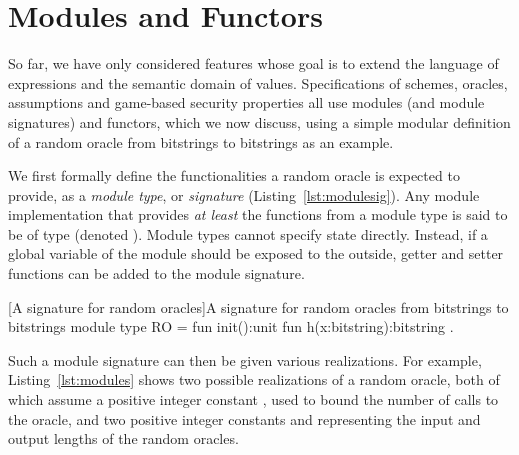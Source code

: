 \section{Modules and Functors\label{sec:modules}}

So far, we have only considered features whose goal is to extend the language of
expressions and the semantic domain of values. Specifications of schemes,
oracles, assumptions and game-based security properties all use modules (and
module signatures) and functors, which we now discuss, using a simple modular
definition of a random oracle from bitstrings to bitstrings as an example.

We first formally define the functionalities a random oracle is expected to
provide, as a \emph{module type}, or \emph{signature}
(Listing~\ref{lst:modulesig}). Any module implementation  that provides
\emph{at least} the functions from a module type  is said to be of
type  (denoted ). Module types cannot specify state
directly. Instead, if a global variable of the module should be exposed to the
outside, getter and setter functions can be added to the module signature.

\begin{easycrypt}[label={lst:modulesig}]{[A signature for random oracles]A signature for random oracles from bitstrings to bitstrings}
module type RO = {
  fun init():unit
  fun h(x:bitstring):bitstring }.
\end{easycrypt}

Such a module signature can then be given various realizations. For example, Listing~\ref{lst:modules} shows two possible realizations of a random oracle, both of which assume a positive integer constant , used to bound the number of calls to the oracle, and two positive integer constants  and  representing the input and output lengths of the random oracles.

